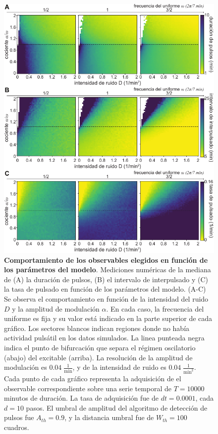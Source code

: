 \documentclass[./main.tex]{subfiles}
\begin{document}
 \begin{figure}
    \centering 
    \includegraphics[width=1\columnwidth]{figures/chapter6/C6_2d_plots.pdf} 
    \caption{\textbf{Comportamiento de los observables elegidos en función de los parámetros del modelo}. Mediciones numéricas de la mediana de (A) la duración de pulsos, (B) el intervalo de interpulsado y (C) la tasa de pulsado en función de los parámetros del modelo. (A-C) Se observa el comportamiento en función de la intensidad del ruido $D$  y la amplitud de modulación $\alpha$. En cada caso, la frecuencia del uniforme es fija y su valor está indicado en la parte superior de cada gráfico. Los sectores blancos indican regiones donde no había actividad pulsátil en los datos simulados. La linea punteada negra indica el punto de bifurcación que separa el régimen oscilatorio (abajo) del excitable (arriba). La resolución de la amplitud de modulación es $0.04\; \frac{1}{\text{min}}$, y de la intensidad de ruido es $0.04\; \frac{1}{\text{min}^2}$. Cada punto de cada gráfico representa la adquisición de el observable correspondiente sobre una serie temporal de $T = 10000$ minutos de duración. La tasa de adquisición fue de $dt = 0.0001$, cada $d = 10$ pasos. El umbral de amplitud del algoritmo de detección de pulsos fue $A_{th} = 0.9$, y la distancia umbral fue de $W_{th} = 100 $ cuadros.}
    \label{C6_fig:2d_plots}
\end{figure}
\end{document}
